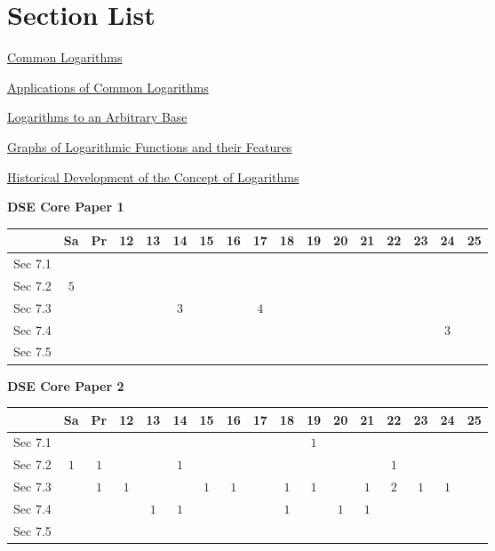 \documentclass[12pt, a4paper]{article}
\begin{document}
\section*{Section List}
\begin{enumx}[label=Sec 7.\arabic*\ ]
\item \hyperref[section:4-7-1]{Common Logarithms \NF}
\item \hyperref[section:4-7-2]{Applications of Common Logarithms \NF}
\item \hyperref[section:4-7-3]{Logarithms to an Arbitrary Base \NF}
\item \hyperref[section:4-7-4]{Graphs of Logarithmic Functions and their Features \NF}
\item \hyperref[section:4-7-5]{Historical Development of the Concept of Logarithms \NF}
\end{enumx}
\begin{absolutelynopagebreak}
\begin{center}
\textbf{DSE Core Paper 1}
\end{center}
\begin{center}
\begin{tabular}{|l|c|c|c|c|c|c|c|c|c|c|c|c|c|c|c|c|}
\hline
        & Sa & Pr & 12 & 13 & 14 & 15 & 16 & 17 & 18 & 19 & 20 & 21 & 22 & 23 & 24 & 25 \\\hline\hline
Sec 7.1 &  &  &  &  &  &  &  &  &  &  &  &  &  &  &  &  \\\hline
Sec 7.2 &  $5$ &  &  &  &  &  &  &  &  &  &  &  &  &  &  &  \\\hline
Sec 7.3 &  &  &  &  &  $3$ &  &  &  $4$ &  &  &  &  &  &  &  &  \\\hline
Sec 7.4 &  &  &  &  &  &  &  &  &  &  &  &  &  &  &  $3$ &  \\\hline
Sec 7.5 &  &  &  &  &  &  &  &  &  &  &  &  &  &  &  &  \\\hline
\end{tabular}
\end{center}
\end{absolutelynopagebreak}
\begin{absolutelynopagebreak}
\begin{center}
\textbf{DSE Core Paper 2}
\end{center}
\begin{center}
\begin{tabular}{|l|c|c|c|c|c|c|c|c|c|c|c|c|c|c|c|c|}
\hline
        & Sa & Pr & 12 & 13 & 14 & 15 & 16 & 17 & 18 & 19 & 20 & 21 & 22 & 23 & 24 & 25 \\\hline\hline
Sec 7.1 &  &  &  &  &  &  &  &  &  &  $1$ &  &  &  &  &  &  \\\hline
Sec 7.2 &  $1$ &  $1$ &  &  &  $1$ &  &  &  &  &  &  &  &  $1$ &  &  &  \\\hline
Sec 7.3 &  &  $1$ &  $1$ &  &  &  $1$ &  $1$ &  &  $1$ &  $1$ &  &  $1$ &  $2$ &  $1$ &  $1$ &  \\\hline
Sec 7.4 &  &  &  &  $1$ &  $1$ &  &  &  &  $1$ &  &  $1$ &  $1$ &  &  &  &  \\\hline
Sec 7.5 &  &  &  &  &  &  &  &  &  &  &  &  &  &  &  &  \\\hline
\end{tabular}
\end{center}
\end{absolutelynopagebreak}
\end{document}
